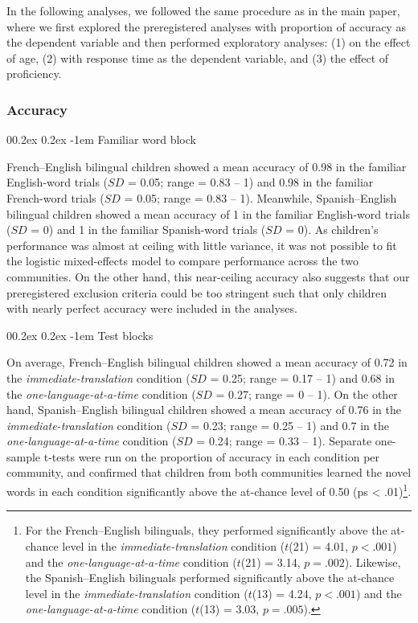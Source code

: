 \documentclass[
  man,floatsintext]{apa7}
\makeatletter
\let\oldparagraph\paragraph
\renewcommand{\paragraph}[1]{\oldparagraph{#1}\mbox{}}
\renewcommand{\paragraph}{\@startsection{paragraph}{4}{\parindent}%
  {0\baselineskip \@plus 0.2ex \@minus 0.2ex}%
  {-1em}%
  {\normalfont\normalsize\bfseries\itshape\typesectitle}}
\renewcommand{\paragraph}{\@startsection{paragraph}{4}{\parindent}%
  {0\baselineskip \@plus 0.2ex \@minus 0.2ex}%
  {-1em}%
  {\normalfont\normalsize\bfseries\typesectitle}}
\makeatother
\begin{document}
In the following analyses, we followed the same procedure as in the main paper, where we first explored the preregistered analyses with proportion of accuracy as the dependent variable and then performed exploratory analyses: (1) on the effect of age, (2) with response time as the dependent variable, and (3) the effect of proficiency.

\hypertarget{accuracy}{%
\subsubsection{Accuracy}\label{accuracy}}

\hypertarget{familiar-word-block}{%
\paragraph{Familiar word block}\label{familiar-word-block}}

French--English bilingual children showed a mean accuracy of 0.98 in the familiar English-word trials (\(SD\) = 0.05; range = 0.83 -- 1) and 0.98 in the familiar French-word trials (\(SD\) = 0.05; range = 0.83 -- 1). Meanwhile, Spanish--English bilingual children showed a mean accuracy of 1 in the familiar English-word trials (\(SD\) = 0) and 1 in the familiar Spanish-word trials (\(SD\) = 0). As children's performance was almost at ceiling with little variance, it was not possible to fit the logistic mixed-effects model to compare performance across the two communities. On the other hand, this near-ceiling accuracy also suggests that our preregistered exclusion criteria could be too stringent such that only children with nearly perfect accuracy were included in the analyses.

\hypertarget{test-blocks}{%
\paragraph{Test blocks}\label{test-blocks}}

On average, French--English bilingual children showed a mean accuracy of 0.72 in the \emph{immediate-translation} condition (\(SD\) = 0.25; range = 0.17 -- 1) and 0.68 in the \emph{one-language-at-a-time} condition (\(SD\) = 0.27; range = 0 -- 1). On the other hand, Spanish--English bilingual children showed a mean accuracy of 0.76 in the \emph{immediate-translation} condition (\(SD\) = 0.23; range = 0.25 -- 1) and 0.7 in the \emph{one-language-at-a-time} condition (\(SD\) = 0.24; range = 0.33 -- 1). Separate one-sample t-tests were run on the proportion of accuracy in each condition per community, and confirmed that children from both communities learned the novel words in each condition significantly above the at-chance level of 0.50 (ps \textless{} .01)\footnote{For the French--English bilinguals, they performed significantly above the at-chance level in the \emph{immediate-translation} condition (\(t\)(21) = 4.01, \(p < .001\)) and the \emph{one-language-at-a-time} condition (\(t\)(21) = 3.14, \(p = .002\)). Likewise, the Spanish--English bilinguals performed significantly above the at-chance level in the \emph{immediate-translation} condition (\(t\)(13) = 4.24, \(p < .001\)) and the \emph{one-language-at-a-time} condition (\(t\)(13) = 3.03, \(p = .005\)).}.
\end{document}
